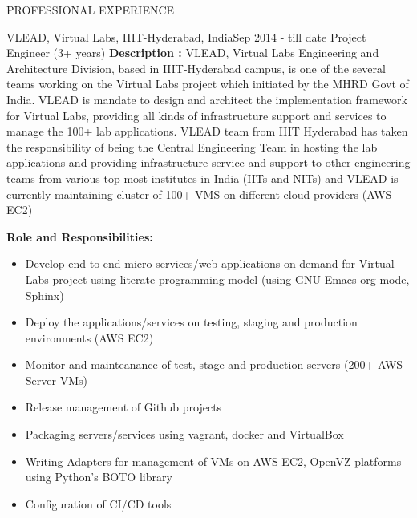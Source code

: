 \documentclass{resume} %
\begin{document}
\begin{rSection}{PROFESSIONAL EXPERIENCE}

   \begin{rSubsection}
    {VLEAD, Virtual Labs, IIIT-Hyderabad, India}{Sep 2014 - till date}
    {Project Engineer} {(3+ years)} \hfill \break \textbf{Description
      :} VLEAD, Virtual Labs Engineering and Architecture Division,
    based in IIIT-Hyderabad campus, is one of the several teams
    working on the Virtual Labs project which initiated by the MHRD
    Govt of India. VLEAD is mandate to design and architect the
    implementation framework for Virtual Labs, providing all kinds of
    infrastructure support and services to manage the 100+ lab
    applications. VLEAD team from IIIT Hyderabad has taken the
    responsibility of being the Central Engineering Team in hosting
    the lab applications and providing infrastructure service and
    support to other engineering teams from various top most
    institutes in India (IITs and NITs) and VLEAD is currently
    maintaining cluster of 100+ VMS on different cloud providers (AWS
    EC2) \\

    \break
    
    \textbf{Role and Responsibilities:}
    \begin{itemize}
      
    \item Develop end-to-end micro services/web-applications
      on demand for Virtual Labs project using literate
      programming model (using GNU Emacs org-mode, Sphinx)

    \item Deploy the applications/services on testing, staging and
      production environments (AWS EC2)

    \item Monitor and mainteanance of test, stage and production
      servers (200+ AWS Server VMs)

    \item Release management of Github projects
      
    \item Packaging servers/services using vagrant,
      docker and VirtualBox

    \item Writing Adapters for management of VMs on AWS EC2,
      OpenVZ platforms using Python's BOTO library

    \item Configuration of CI/CD tools
      

\end{itemize}
\end{rSubsection}
\end{rSection}
\end{document}
